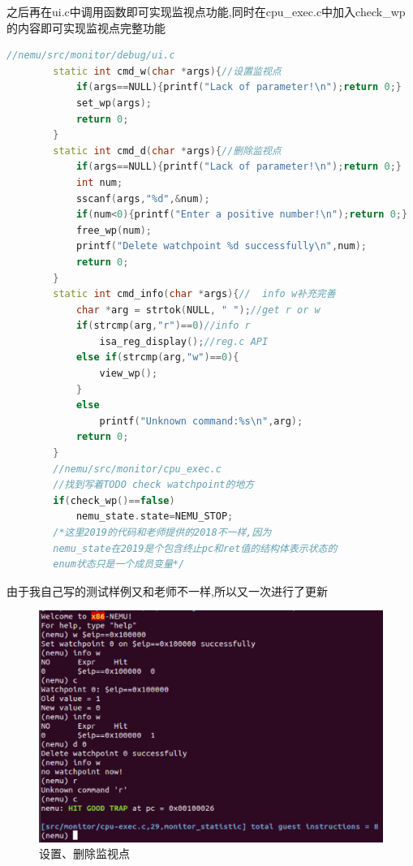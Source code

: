 \documentclass[UTF8,a4paper,10pt]{ctexart}
\begin{document}
{    之后再在ui.c中调用函数即可实现监视点功能,同时在cpu\_exec.c中加入check\_wp的内容即可实现监视点完整功能
    \begin{lstlisting}[title=监视点ui,frame=trbl,language={C++}]
        //nemu/src/monitor/debug/ui.c
        static int cmd_w(char *args){//设置监视点
            if(args==NULL){printf("Lack of parameter!\n");return 0;}
            set_wp(args);
            return 0;
        }
        static int cmd_d(char *args){//删除监视点
            if(args==NULL){printf("Lack of parameter!\n");return 0;}
            int num;
            sscanf(args,"%d",&num);
            if(num<0){printf("Enter a positive number!\n");return 0;}
            free_wp(num);
            printf("Delete watchpoint %d successfully\n",num);
            return 0;
        }
        static int cmd_info(char *args){//  info w补充完善
            char *arg = strtok(NULL, " ");//get r or w
            if(strcmp(arg,"r")==0)//info r
                isa_reg_display();//reg.c API  
            else if(strcmp(arg,"w")==0){
                view_wp();
            }
            else
                printf("Unknown command:%s\n",arg);
            return 0;
        }
        //nemu/src/monitor/cpu_exec.c
        //找到写着TODO check watchpoint的地方
        if(check_wp()==false)
            nemu_state.state=NEMU_STOP;
        /*这里2019的代码和老师提供的2018不一样,因为
        nemu_state在2019是个包含终止pc和ret值的结构体表示状态的
        enum状态只是一个成员变量*/
    \end{lstlisting}
    由于我自己写的测试样例又和老师不一样,所以又一次进行了更新
    \begin{figure}[H]
        \centering
        \includegraphics[scale=0.45]{fig/11.png}
        \caption{设置、删除监视点}
    \end{figure}
}
\end{document}
